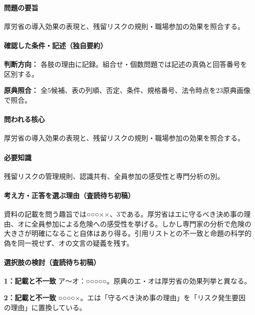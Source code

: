\paragraph{問題の要旨} 厚労省の導入効果の表現と、残留リスクの規則・職場参加の効果を照合する。

\paragraph{確認した条件・記述（独自要約）}\mbox{}\par

\noindent\textbf{判断方向：} 各肢の理由に記録。組合せ・個数問題では記述の真偽と回答番号を区別する。\par

\noindent\textbf{原典照合：} 全5候補、表の列順、否定、条件、規格番号、法令時点を23原典画像で照合。\par

\paragraph{問われる核心} 厚労省の導入効果の表現と、残留リスクの規則・職場参加の効果を照合する。

\paragraph{必要知識} 残留リスクの管理規則、認識共有、全員参加の感受性と専門分析の別。

\paragraph{考え方・正答を選ぶ理由（査読待ち初稿）} 資料の記載を問う趣旨では○○○××、3である。厚労省はエに守るべき決め事の理由、オに全員参加による危険への感受性を挙げる。しかし専門家の分析で危険の大きさが明確になること自体はあり得る。引用リストとの不一致と命題の科学的偽を同一視せず、オの文言の疑義を残す。

\paragraph{選択肢の検討（査読待ち初稿）}\mbox{}\par

\noindent\textbf{1：記載と不一致} ア〜オ：○○○○○。原典のエ・オは厚労省の効果列挙と異なる。\par

\noindent\textbf{2：記載と不一致} ○○○○×。エは「守るべき決め事の理由」を「リスク発生要因の理由」に置換している。\par

